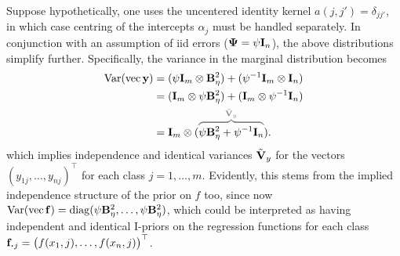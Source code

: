 Suppose hypothetically, one uses the uncentered identity kernel $a(j,j') = \delta_{jj'}$, in which case centring of the intercepts $\alpha_j$ must be handled separately.
In conjunction with an assumption of iid errors (${\bm\Psi} = \psi{\mathbf I}_n$), the above distributions simplify further.
Specifically, the variance in the marginal distribution becomes 
\begin{align*}
  \Var(\vecc \by) 
  &= (\psi\bI_m \otimes \bB_\eta^2) + (\psi^{-1}\bI_m \otimes \bI_n) \\
  &= (\bI_m \otimes \psi\bB_\eta^2) + (\bI_m \otimes \psi^{-1}\bI_n) \\
  &= \bI_m \otimes (\myoverbrace{\psi\bB_\eta^2 + \psi^{-1}\bI_n}{\tilde\bV_y}).
\end{align*}
which implies independence and identical variances $\tilde{{\mathbf V}}_y$ for the vectors $(y_{1j},\dots,y_{nj})^\top$ for each class $j=1,\dots,m$.
Evidently, this stems from the implied independence structure of the prior on $f$ too, since now $\operatorname{Var} (\operatorname{vec} {\mathbf f}) = \operatorname{diag}(\psi{\mathbf B}_\eta^2,\dots, \psi{\mathbf B}_\eta^2)$, which could be interpreted as having independent and identical I-priors on the regression functions for each class $\bff_{\bigcdot j} = \big(f(x_1,j),\dots,f(x_n,j)\big)^\top$.
